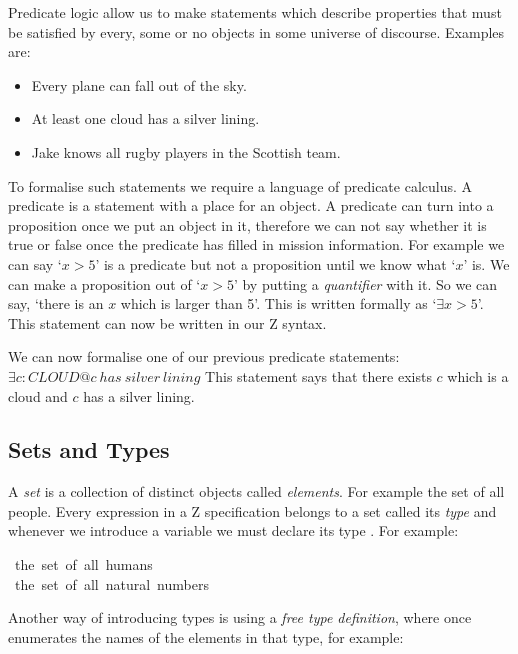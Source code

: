 Predicate logic allow us to make statements which describe properties that must be satisfied by every, some or no objects in some universe of discourse. Examples are:

\begin{itemize}
\item Every plane can fall out of the sky.

\item At least one cloud has a silver lining.

\item Jake knows all rugby players in the Scottish team.
\end{itemize}

To formalise such statements we require a language of predicate calculus. A predicate is a statement with a place for an object. A predicate can turn into a proposition once we put an object in it, therefore we can not say whether it is true or false once the predicate has filled in mission information. For example we can say `$x > 5$' is a predicate but not a proposition until we know what `$x$' is. We can make a proposition out of `$x > 5$' by putting a \textit{quantifier} with it. So we can say, `there is an $x$ which is larger than 5'. This is written formally as `$\exists x > 5$'. This statement can now be written in our Z syntax.

We can now formalise one of our previous predicate statements:
\newline
$\exists c: CLOUD @ c\ has\ silver\ lining$
This statement says that there exists $c$ which is a cloud and $c$ has a silver lining.

\subsection{Sets and Types}

A \textit{set} is a collection of distinct objects called \textit{elements}. For example the set of all people. Every expression in a Z specification belongs to a set called its \textit{type} and whenever we introduce a variable we must declare its type \cite{essenceofz}. For example:

\begin{zed}
[HUMAN]\ the\ set\ of\ all\ humans \\
\nat\ the\ set\ of\ all\ natural\ numbers
\end{zed}

Another way of introducing types is using a \textit{free type definition}, where once enumerates the names of the elements in that type, for example:

